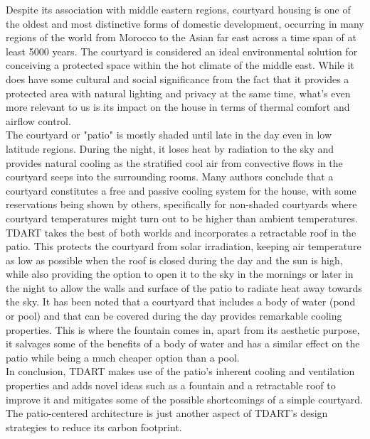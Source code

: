 \documentclass[justified]{tufte-book}
\begin{document}
	Despite its association with middle eastern regions, courtyard housing is one of the oldest and most distinctive forms of domestic development, occurring in many regions of the world from Morocco to the Asian far east across a time span of at least 5000 years\cite{edwards2006courtyard}. The courtyard is considered an ideal environmental solution for conceiving a protected space within the hot climate of the middle east\cite{radoine2017}. While it does have some cultural and social significance from the fact that it provides a protected area with natural lighting and privacy at the same time, what's even more relevant to us is its impact on the house in terms of thermal comfort and airflow control.\\
	The courtyard or "patio" is mostly shaded until late in the day even in low latitude regions. During the night, it loses heat by radiation to the sky\cite{batty1991natural} and provides natural cooling as the stratified cool air from convective flows in the courtyard seeps into the surrounding rooms. Many authors\cite{scudo1988climatic,fathy1986natural} conclude that a courtyard constitutes a free and passive cooling system for the house, with some reservations being shown by others\cite{etzion1990thermal}, specifically for non-shaded courtyards where courtyard temperatures might turn out to be higher than ambient temperatures. TDART takes the best of both worlds and incorporates a retractable roof in the patio. This protects the courtyard from solar irradiation, keeping air temperature as low as possible when the roof is closed during the day and the sun is high, while also providing the option to open it to the sky in the mornings or later in the night to allow the walls and surface of the patio to radiate heat away towards the sky. It has been noted that a courtyard that includes a body of water (pond or pool) and that can be covered during the day provides remarkable cooling properties\cite{al2001effect}. This is where the fountain comes in, apart from its aesthetic purpose, it salvages some of the benefits of a body of water and has a similar effect on the patio while being a much cheaper option than a pool.\\
	In conclusion, TDART makes use of the patio's inherent cooling and ventilation properties and adds novel ideas such as a fountain and a retractable roof to improve it and mitigates some of the possible shortcomings of a simple courtyard. The patio-centered architecture is just another aspect of TDART's design strategies to reduce its carbon footprint.
	\newpage
\end{document}
